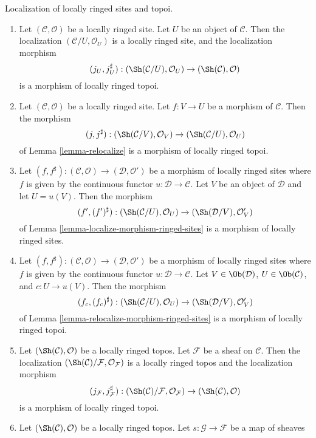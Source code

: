 \begin{lemma}
\label{lemma-localize-morphism-locally-ringed-topoi}
Localization of locally ringed sites and topoi.
\begin{enumerate}
\item Let $(\mathcal{C}, \mathcal{O})$ be a locally ringed site.
Let $U$ be an object of $\mathcal{C}$. Then the localization
$(\mathcal{C}/U, \mathcal{O}_U)$ is a locally ringed site, and
the localization morphism
$$
(j_U, j_U^\sharp) :
(\Sh(\mathcal{C}/U), \mathcal{O}_U)
\to
(\Sh(\mathcal{C}), \mathcal{O})
$$
is a morphism of locally ringed topoi.
\item Let $(\mathcal{C}, \mathcal{O})$ be a locally ringed site.
Let $f : V \to U$ be a morphism of $\mathcal{C}$.
Then the morphism
$$
(j, j^\sharp) :
(\Sh(\mathcal{C}/V), \mathcal{O}_V)
\to
(\Sh(\mathcal{C}/U), \mathcal{O}_U)
$$
of
Lemma \ref{lemma-relocalize}
is a morphism of locally ringed topoi.
\item Let
$(f, f^\sharp) :
(\mathcal{C}, \mathcal{O})
\longrightarrow
(\mathcal{D}, \mathcal{O}')$
be a morphism of locally ringed sites where $f$ is given by the continuous
functor $u : \mathcal{D} \to \mathcal{C}$. Let $V$ be an object of
$\mathcal{D}$ and let $U = u(V)$. Then the morphism
$$
(f', (f')^\sharp) :
(\Sh(\mathcal{C}/U), \mathcal{O}_U)
\to
(\Sh(\mathcal{D}/V), \mathcal{O}'_V)
$$
of
Lemma \ref{lemma-localize-morphism-ringed-sites}
is a morphism of locally ringed sites.
\item Let
$(f, f^\sharp) :
(\mathcal{C}, \mathcal{O})
\longrightarrow
(\mathcal{D}, \mathcal{O}')$
be a morphism of locally ringed sites where $f$ is given by the continuous
functor $u : \mathcal{D} \to \mathcal{C}$. Let $V \in \Ob(\mathcal{D})$,
$U \in \Ob(\mathcal{C})$, and $c : U \to u(V)$. Then the morphism
$$
(f_c, (f_c)^\sharp) :
(\Sh(\mathcal{C}/U), \mathcal{O}_U)
\to
(\Sh(\mathcal{D}/V), \mathcal{O}'_V)
$$
of
Lemma \ref{lemma-relocalize-morphism-ringed-sites}
is a morphism of locally ringed topoi.
\item Let $(\Sh(\mathcal{C}), \mathcal{O})$ be a locally
ringed topos. Let $\mathcal{F}$ be a sheaf on $\mathcal{C}$.
Then the localization
$(\Sh(\mathcal{C})/\mathcal{F}, \mathcal{O}_\mathcal{F})$
is a locally ringed topos and the localization morphism
$$
(j_\mathcal{F}, j_\mathcal{F}^\sharp) :
(\Sh(\mathcal{C})/\mathcal{F}, \mathcal{O}_\mathcal{F})
\to
(\Sh(\mathcal{C}), \mathcal{O})
$$
is a morphism of locally ringed topoi.
\item  Let $(\Sh(\mathcal{C}), \mathcal{O})$ be a locally
ringed topos. Let $s : \mathcal{G} \to \mathcal{F}$ be a map of sheaves

\end{enumerate}
\end{lemma}
